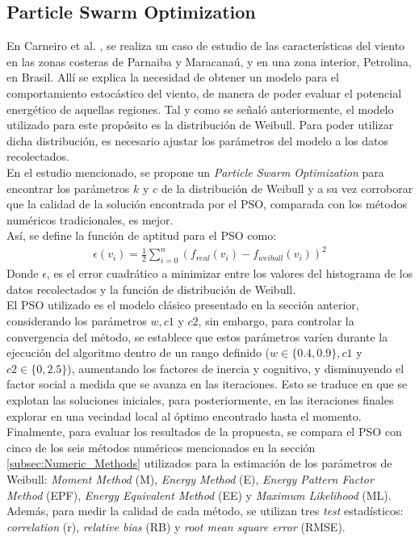  \subsection{Particle Swarm Optimization}
 En Carneiro et al. \cite{Carneiro15}, se realiza un caso de estudio de las características del viento en las zonas costeras de Parnaiba y Maracanaú, y en una zona interior, Petrolina, en Brasil. Allí se explica la necesidad de obtener un modelo para el comportamiento estocástico del viento, de manera de poder evaluar el potencial energético de aquellas regiones. Tal y como se señaló anteriormente, el modelo utilizado para este propósito es la distribución de Weibull. Para poder utilizar dicha distribución, es necesario ajustar los parámetros del modelo a los datos recolectados.\\
 En el estudio mencionado, se propone un \emph{Particle Swarm Optimization} para encontrar los parámetros $k$ y $c$ de la distribución de Weibull y a su vez corroborar que la calidad de la solución encontrada por el PSO, comparada con los métodos numéricos tradicionales, es mejor.\\
 Así, se define la función de aptitud para el PSO como:
\begin{align}\label{eq:PSO_FO}
    \epsilon(v_i) = \frac{1}{2}\sum_{i=0}^{n}(f_{real}(v_i) - f_{weibull}(v_i))^2
\end{align}
Donde $\epsilon$, es el error cuadrático a minimizar entre los valores del histograma de los datos recolectados y la función de distribución de Weibull.\\
El PSO utilizado es el modelo clásico presentado en la sección anterior, considerando los parámetros $w, c1$ y $c2$, sin embargo, para controlar la convergencia del método, se establece que estos parámetros varíen durante la ejecución del algoritmo dentro de un rango definido ($w \in \{0.4, 0.9\}, c1$ y $c2 \in \{0, 2.5\}$), aumentando los factores de inercia y cognitivo, y disminuyendo el factor social a medida que se avanza en las iteraciones. Esto se traduce en que se explotan las soluciones iniciales, para posteriormente, en las iteraciones finales explorar en una vecindad local al óptimo encontrado hasta el momento.\\
Finalmente, para evaluar los resultados de la propuesta, se compara el PSO con cinco de los seis métodos numéricos mencionados en la sección \ref{subsec:Numeric_Methods} utilizados para la estimación de los parámetros de Weibull: \emph{Moment Method} (M), \emph{Energy Method} (E), \emph{Energy Pattern Factor Method} (EPF), \emph{Energy Equivalent Method} (EE) y \emph{Maximum Likelihood} (ML). Además, para medir la calidad de cada método, se utilizan tres \emph{test} estadísticos: \emph{correlation} (r), \emph{relative bias} (RB) y \emph{root mean square error} (RMSE).\\
